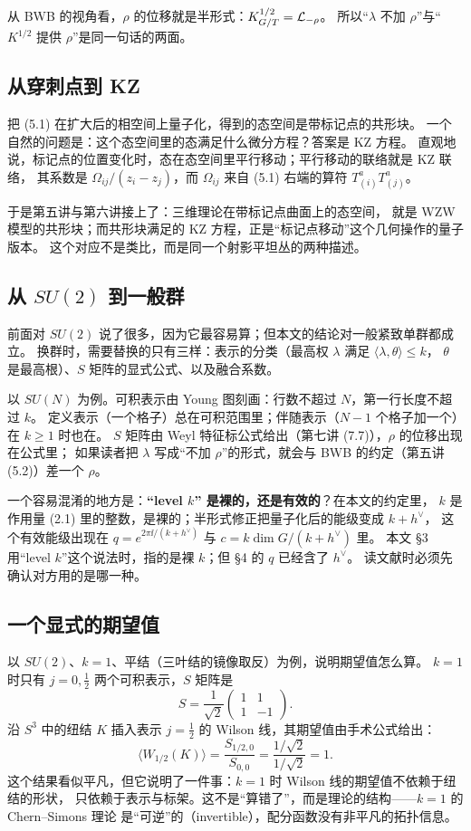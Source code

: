 从 BWB 的视角看，$\rho$ 的位移就是半形式：$K_{G/T}^{1/2}=\mathcal{L}_{-\rho}$。
所以“$\lambda$ 不加 $\rho$”与“$K^{1/2}$ 提供 $\rho$”是同一句话的两面。

\subsection{从穿刺点到 KZ}

把 (5.1) 在扩大后的相空间上量子化，得到的态空间是带标记点的共形块。
一个自然的问题是：这个态空间里的态满足什么微分方程？答案是 KZ 方程。
直观地说，标记点的位置变化时，态在态空间里平行移动；平行移动的联络就是 KZ 联络，
其系数是 $\Omega_{ij}/(z_i-z_j)$，而 $\Omega_{ij}$ 来自 (5.1) 右端的算符 $T^a_{(i)}T^a_{(j)}$。

于是第五讲与第六讲接上了：三维理论在带标记点曲面上的态空间，
就是 WZW 模型的共形块；而共形块满足的 KZ 方程，正是“标记点移动”这个几何操作的量子版本。
这个对应不是类比，而是同一个射影平坦丛的两种描述。

\subsection{从 $SU(2)$ 到一般群}

前面对 $SU(2)$ 说了很多，因为它最容易算；但本文的结论对一般紧致单群都成立。
换群时，需要替换的只有三样：表示的分类（最高权 $\lambda$ 满足 $\langle\lambda,\theta\rangle\le k$，
$\theta$ 是最高根）、$S$ 矩阵的显式公式、以及融合系数。

以 $SU(N)$ 为例。可积表示由 Young 图刻画：行数不超过 $N$，第一行长度不超过 $k$。
定义表示（一个格子）总在可积范围里；伴随表示（$N-1$ 个格子加一个）在 $k\ge1$ 时也在。
$S$ 矩阵由 Weyl 特征标公式给出（第七讲 (7.7)），$\rho$ 的位移出现在公式里；
如果读者把 $\lambda$ 写成“不加 $\rho$”的形式，就会与 BWB 的约定（第五讲 (5.2)）差一个 $\rho$。

一个容易混淆的地方是：\textbf{“level $k$” 是裸的，还是有效的}？在本文的约定里，
$k$ 是作用量 (2.1) 里的整数，是裸的；半形式修正把量子化后的能级变成 $k+h^\vee$，
这个有效能级出现在 $q=e^{2\pi\ii/(k+h^\vee)}$ 与 $c=k\dim G/(k+h^\vee)$ 里。
本文 §3 用“level $k$”这个说法时，指的是裸 $k$；但 §4 的 $q$ 已经含了 $h^\vee$。
读文献时必须先确认对方用的是哪一种。

\subsection{一个显式的期望值}

以 $SU(2)$、$k=1$、平结（三叶结的镜像取反）为例，说明期望值怎么算。
$k=1$ 时只有 $j=0,\frac12$ 两个可积表示，$S$ 矩阵是
\[
S=\frac{1}{\sqrt2}\begin{pmatrix}1&1\\1&-1\end{pmatrix}.
\]
沿 $S^3$ 中的纽结 $K$ 插入表示 $j=\frac12$ 的 Wilson 线，其期望值由手术公式给出：
\[
\langle W_{1/2}(K)\rangle=\frac{S_{1/2,0}}{S_{0,0}}
=\frac{1/\sqrt2}{1/\sqrt2}=1 .
\]
这个结果看似平凡，但它说明了一件事：$k=1$ 时 Wilson 线的期望值不依赖于纽结的形状，
只依赖于表示与标架。这不是“算错了”，而是理论的结构——$k=1$ 的 Chern--Simons 理论
是“可逆”的（invertible），配分函数没有非平凡的拓扑信息。

